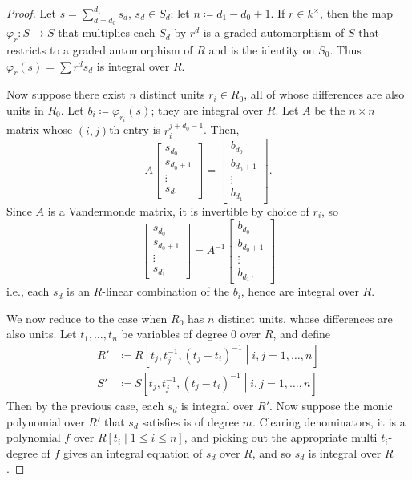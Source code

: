 \documentclass[12pt,letterpaper]{article}
\theoremstyle{definition}
\theoremstyle{remark}
\numberwithin{equation}{section}
\numberwithin{figure}{problem}
\begin{document}
\begin{proof}
  Let $s = \sum_{d=d_0}^{d_1} s_d$, $s_d \in S_d$; let $n \coloneqq d_1 - d_0 + 1$. If $r \in k^\times$, then the map $\varphi_r\colon S \to S$ that multiplies each $S_d$ by $r^d$ is a graded automorphism of $S$ that restricts to a graded automorphism of $R$ and is the identity on $S_0$. Thus $\varphi_r(s) = \sum r^ds_d$ is integral over $R$.
  \par Now suppose there exist $n$ distinct units $r_i \in R_0$, all of whose differences are also units in $R_0$. Let $b_i \coloneqq \varphi_{r_i}(s)$; they are integral over $R$. Let $A$ be the $n \times n$ matrix whose $(i,j)$th entry is $r_i^{j+d_0-1}$. Then,
  \begin{equation*}
    A\begin{bmatrix}
      s_{d_0}\\
      s_{d_0+1}\\
      \vdots\\
      s_{d_1}
    \end{bmatrix}
    = \begin{bmatrix}
      b_{d_0}\\
      b_{d_0+1}\\
      \vdots\\
      b_{d_1}
    \end{bmatrix}.
  \end{equation*}
  Since $A$ is a Vandermonde matrix, it is invertible by choice of $r_i$, so
  \begin{equation*}
    \begin{bmatrix}
      s_{d_0}\\
      s_{d_0+1}\\
      \vdots\\
      s_{d_1}
    \end{bmatrix}
    = A^{-1}\begin{bmatrix}
      b_{d_0}\\
      b_{d_0+1}\\
      \vdots\\
      b_{d_1},
    \end{bmatrix}
  \end{equation*}
  i.e., each $s_d$ is an $R$-linear combination of the $b_i$, hence are integral over $R$.
  \par We now reduce to the case when $R_0$ has $n$ distinct units, whose differences are also units. Let $t_1,\ldots,t_n$ be variables of degree $0$ over $R$, and define
  \begin{align*}
    R' &\coloneqq R\left[t_j,t_j^{-1},(t_j-t_i)^{-1} \middle\vert i,j = 1,\ldots,n\right]\\
    S' &\coloneqq S\left[t_j,t_j^{-1},(t_j-t_i)^{-1} \middle\vert i,j = 1,\ldots,n\right]
  \end{align*}
  Then by the previous case, each $s_d$ is integral over $R'$. Now suppose the monic polynomial over $R'$ that $s_d$ satisfies is of degree $m$. Clearing denominators, it is a polynomial $f$ over $R[t_i \mid 1 \le i \le n]$, and picking out the appropriate multi $t_i$-degree of $f$ gives an integral equation of $s_d$ over $R$, and so $s_d$ is integral over $R$.
\end{proof}
\end{document}
